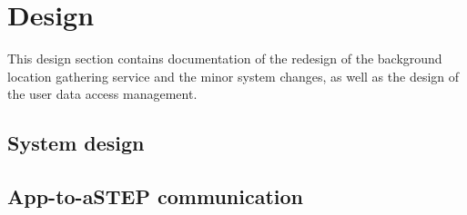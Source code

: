 \section{Design}
This design section contains documentation of the redesign of the background location gathering service and the minor system changes, as well as the design of the user data access management.

\subsection{System design}






\subsection{App-to-aSTEP communication}

